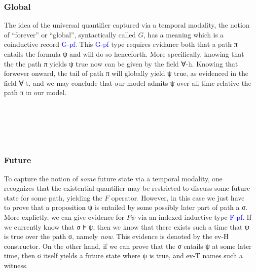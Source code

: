 \documentclass{article}
\newcommand{\blue}[1]{\textcolor{blue}{#1}}
\newcommand{\green}[1]{\textcolor{hooker\'sgreen}{#1}}
\newcommand{\pink}[1]{\textcolor{hotmagenta}{#1}}
\begin{document}
\subsubsection{Global}

The idea of the universal quantifier captured via a temporal modality, the
notion of ``forever'' or ``global'', syntactically called $G$, has a meaning
which is a coinductive record \blue{G-pf}. This \blue{G-pf} type requires
evidance both that a path π entails the formula ψ and will do so henceforth.
More specifically, knowing that the the path π yields ψ true now can be given by
the field \pink{∀-h}. Knowing that forwever onward, the tail of path π will
globally yield ψ true, as evidenced in the field \pink{∀-t}, and we may conclude that our
model admits ψ over all time relative the path π in our model.

\begin{code}%
%
\>[2]\AgdaSpace{}%
\AgdaSpace{}%
\AgdaSymbol{(}\AgdaSpace{}%
\AgdaSymbol{:}\AgdaSpace{}%
\AgdaSpace{}%
\AgdaSpace{}%
\AgdaSymbol{)}\AgdaSpace{}%
\AgdaSymbol{(}\AgdaSpace{}%
\AgdaSymbol{:}\AgdaSpace{}%
\AgdaSymbol{)}\AgdaSpace{}%
\AgdaSymbol{:}\AgdaSpace{}%
\AgdaSpace{}%
\<%
\\
\>[2][@{}l@{\AgdaIndent{0}}]%
\>[4]\<%
\\
%
\>[4]\<%
\\
\>[4][@{}l@{\AgdaIndent{0}}]%
\>[6]\AgdaSpace{}%
\AgdaSymbol{:}\AgdaSpace{}%
\AgdaSpace{}%
\<%
\\
%
\>[6]\AgdaSpace{}%
\AgdaSymbol{:}\AgdaSpace{}%
\AgdaSpace{}%
\AgdaSpace{}%
\AgdaSymbol{(}\AgdaSpace{}%
\AgdaSymbol{)}\<%
\end{code}

\subsubsection{Future}

To capture the notion of \emph{some} future state via a temporal modality, one
recognizes that the existential quantifier may be restricted to discuss some
future state for some path, yielding the $F$ operator. However, in this case we
just have to prove that a proposition ψ is entailed by some possibly later part
of path a σ. More explictly, we can give evidence for $F \psi$ via an indexed
inductive type \blue{F-pf}. If we currently know that σ ⊧ ψ, then we know that
there exists such a time that ψ is true over the path σ, namely \emph{now}. This
evidence is denoted by the \green{ev-H} constructor. On the other hand, if we
can prove that the σ entails ψ at some later time, then σ itself yields a future
state where ψ is true, and \green{ev-T} names such a witness.
\end{document}
